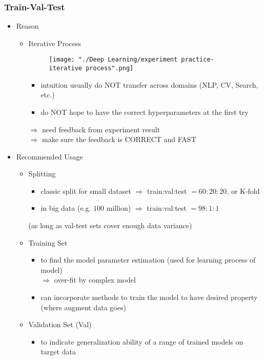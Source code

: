 \subsubsection{Train-Val-Test}
\begin{itemize}
\item Reason
	\begin{itemize}
	\item Iterative Process
		\begin{figure}[!ht]
		\texttt{[image: "./Deep Learning/experiment practice-iterative process".png]}
		\end{figure}
		\begin{itemize}
		\item intuition usually do NOT transfer across domains (NLP, CV, Search, etc.)
		\item do NOT hope to have the correct hyperparameters at the first try
		\end{itemize}
		$\Rightarrow$ need feedback from experiment result \\
		$\Rightarrow$ make sure the feedback is CORRECT and FAST
	\end{itemize}
\item Recommended Usage
	\begin{itemize}
	\item Splitting 
		\begin{itemize}
		\item classic split for small dataset $\Rightarrow$ train:val:test $= 60:20:20$, or K-fold
		\item in big data (e.g. $100$ million) $\Rightarrow$ train:val:test $= 98:1:1$
		\end{itemize}
		(as long as val-test sets cover enough data variance)
	\item Training Set
		\begin{itemize}
		\item to find the model parameter estimation (used for learning process of model) \\
		$\Rightarrow$ over-fit by complex model
		\item can incorporate methods to train the model to have desired property \\
		(where augment data goes)
		\end{itemize}
	\item Validation Set (Val)
		\begin{itemize}
		\item to indicate generalization ability of a range of trained models on target data \\

\end{itemize}
\end{itemize}
\end{itemize}
